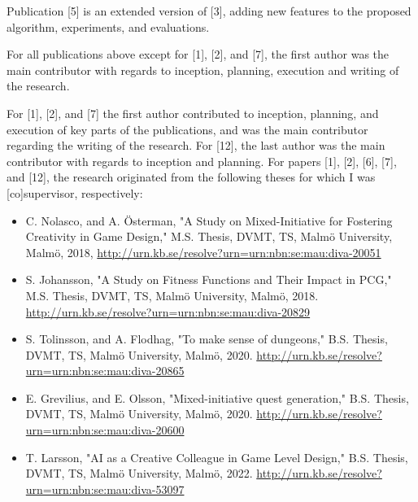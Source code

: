 \documentclass[hidelinks,green,onecolumn,twoside]{dissertation}
\begin{document}
{\selectfont

Publication [5] is an extended version of [3], adding new features to the proposed algorithm, experiments, and evaluations.

For all publications above except for [1], [2], and [7], the first author was the main contributor with regards to inception, planning, execution and writing of the research. %

For [1], [2], and [7] the first author contributed to inception, planning, and execution of key parts of the publications, and was the main contributor regarding the writing of the research. For [12], the last author was the main contributor with regards to inception and planning. For papers [1], [2], [6], [7], and [12], the research originated from the following theses for which I was [co]supervisor, respectively:

\begin{itemize}
    \item C. Nolasco, and A. Österman, "A Study on Mixed-Initiative for Fostering Creativity in Game Design," M.S. Thesis, DVMT, TS, Malmö University, Malmö, 2018, \url{http://urn.kb.se/resolve?urn=urn:nbn:se:mau:diva-20051}
    
    \sloppy
    \item S. Johansson, "A Study on Fitness Functions and Their Impact in PCG," M.S. Thesis, DVMT, TS, Malmö University, Malmö, 2018. \url{http://urn.kb.se/resolve?urn=urn:nbn:se:mau:diva-20829}
    
    \item S. Tolinsson, and A. Flodhag, "To make sense of dungeons," B.S. Thesis, DVMT, TS, Malmö University, Malmö, 2020. \url{http://urn.kb.se/resolve?urn=urn:nbn:se:mau:diva-20865}
    
    \item E. Grevilius, and E. Olsson, "Mixed-initiative quest generation," B.S. Thesis, DVMT, TS, Malmö University, Malmö, 2020. \url{http://urn.kb.se/resolve?urn=urn:nbn:se:mau:diva-20600}
    
    \item T. Larsson, "AI as a Creative Colleague in Game Level Design," B.S. Thesis, DVMT, TS, Malmö University, Malmö, 2022. \url{http://urn.kb.se/resolve?urn=urn:nbn:se:mau:diva-53097}
\end{itemize}
    
    
    
}
\end{document}
